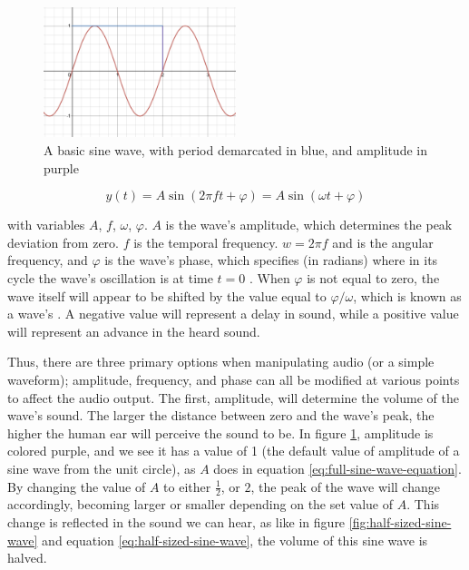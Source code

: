 \begin{figure}
	\centering
	\includegraphics[width=0.5\textwidth]{figures/sine-wave-period-amplitude.png}
	\caption{A basic sine wave, with period demarcated in blue, and amplitude in purple}
	\label{fig:sine-wave-period-amplitude}
\end{figure}

\begin{equation}\label{eq:full-sine-wave-equation}
	y(t) = A \sin(2\pi ft + \varphi) = A\sin(\omega t + \varphi)
\end{equation}

with variables $A$, $f$, $\omega$, $\varphi$. $A$ is the wave's amplitude, which determines the peak deviation from zero. $f$ is the temporal frequency. $w = 2\pi f$ and is the angular frequency, and $\varphi$ is the wave's phase, which specifies (in radians) where in its cycle the wave's oscillation is at time $t = 0$ \cite{Kirk_Hunt_2013}. When $\varphi$ is not equal to zero, the wave itself will appear to be shifted by the value equal to $\varphi / \omega$, which is known as a wave's . A negative value will represent a delay in sound, while a positive value will represent an advance in the heard sound.

Thus, there are three primary options when manipulating audio (or a simple waveform); amplitude, frequency, and phase can all be modified at various points to affect the audio output. The first, amplitude, will determine the volume of the wave's sound. The larger the distance between zero and the wave's peak, the higher the human ear will perceive the sound to be\cite{Zjalic_2021}. In figure \ref{fig:sine-wave-period-amplitude}, amplitude is colored purple, and we see it has a value of 1 (the default value of amplitude of a sine wave from the unit circle), as $A$ does in equation \ref{eq:full-sine-wave-equation}. By changing the value of $A$ to either $\frac{1}{2}$, or $2$, the peak of the wave will change accordingly, becoming larger or smaller depending on the set value of $A$. This change is reflected in the sound we can hear, as like in figure \ref{fig:half-sized-sine-wave} and equation \ref{eq:half-sized-sine-wave}, the volume of this sine wave is halved.

